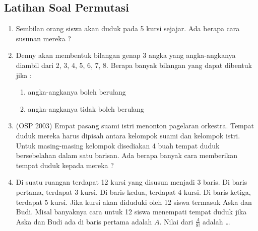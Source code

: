 \subsection{Latihan Soal Permutasi}
\begin{enumerate} 
    \item Sembilan orang siswa akan duduk pada 5 kursi sejajar. Ada berapa cara susunan mereka ? 
    
    \item Denny akan membentuk bilangan genap 3 angka yang angka-angkanya diambil dari 2, 3, 4, 5, 6, 7, 8. Berapa banyak bilangan yang dapat dibentuk jika : 
    \begin{enumerate}
        \item angka-angkanya boleh berulang 
        \item angka-angkanya tidak boleh berulang
    \end{enumerate}
    
    \item (OSP 2003) Empat pasang suami istri menonton pagelaran orkestra. Tempat duduk mereka harus dipisah antara kelompok suami dan kelompok istri. Untuk masing-masing kelompok disediakan 4 buah tempat duduk bersebelahan dalam satu barisan. Ada berapa banyak cara memberikan tempat duduk kepada mereka ?

    \item Di suatu ruangan terdapat 12 kursi yang disusun menjadi 3 baris. Di baris pertama, terdapat 3 kursi. Di baris kedua, terdapat 4 kursi. Di baris ketiga, terdapat 5 kursi. Jika kursi akan diduduki oleh 12 siswa termasuk Aska dan Budi. Misal banyaknya cara untuk 12 siswa menempati tempat duduk jika Aska dan Budi ada di baris pertama adalah $A$. Nilai dari $\frac{A}{8!}$ adalah \ldots

\end{enumerate}
